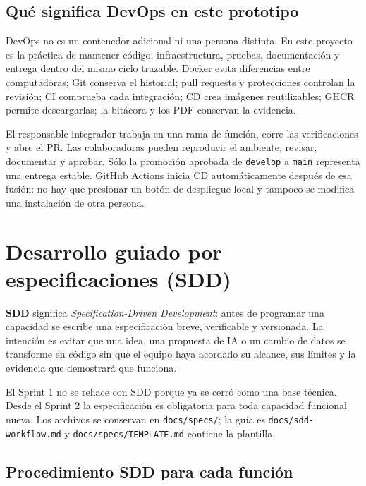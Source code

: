 \documentclass[11pt,letterpaper]{article}
\newcommand{\file}[1]{\texttt{#1}}
\begin{document}
\subsection{Qué significa DevOps en este prototipo}

DevOps no es un contenedor adicional ni una persona distinta. En este proyecto es la práctica de mantener código, infraestructura, pruebas, documentación y entrega dentro del mismo ciclo trazable. Docker evita diferencias entre computadoras; Git conserva el historial; pull requests y protecciones controlan la revisión; CI comprueba cada integración; CD crea imágenes reutilizables; GHCR permite descargarlas; la bitácora y los PDF conservan la evidencia.

El responsable integrador trabaja en una rama de función, corre las verificaciones y abre el PR. Las colaboradoras pueden reproducir el ambiente, revisar, documentar y aprobar. Sólo la promoción aprobada de \file{develop} a \file{main} representa una entrega estable. GitHub Actions inicia CD automáticamente después de esa fusión: no hay que presionar un botón de despliegue local y tampoco se modifica una instalación de otra persona.

\section{Desarrollo guiado por especificaciones (SDD)}

\textbf{SDD} significa \emph{Specification-Driven Development}: antes de programar una capacidad se escribe una especificación breve, verificable y versionada. La intención es evitar que una idea, una propuesta de IA o un cambio de datos se transforme en código sin que el equipo haya acordado su alcance, sus límites y la evidencia que demostrará que funciona.

El Sprint 1 no se rehace con SDD porque ya se cerró como una base técnica. Desde el Sprint 2 la especificación es obligatoria para toda capacidad funcional nueva. Los archivos se conservan en \file{docs/specs/}; la guía es \file{docs/sdd-workflow.md} y \file{docs/specs/TEMPLATE.md} contiene la plantilla.

\subsection{Procedimiento SDD para cada función}
\end{document}
